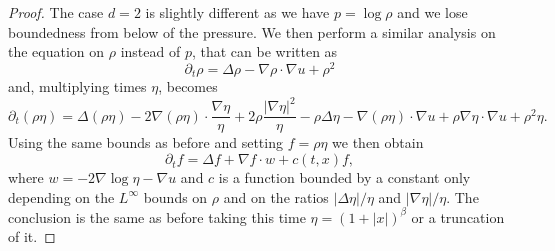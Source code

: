 \documentclass[11pt,a4paper]{article}
\numberwithin{equation}{section}
\theoremstyle{plain}
\theoremstyle{remark}
\begin{document}
\begin{proof}
The case $d=2$ is slightly different as we have $p=\log\rho$ and we lose boundedness from below of the pressure. We then perform a similar analysis on the equation on $\rho$ instead of $p$, that can be written as
$$
    \partial_t\rho=\Delta\rho-\nabla\rho\cdot\nabla u +\rho^2
$$
and, multiplying times $\eta$, becomes
$$
    \partial_t(\rho\eta)=\Delta(\rho\eta)-2\nabla(\rho\eta)\cdot\frac{\nabla\eta}{\eta}+2\rho\frac{|\nabla\eta|^2}{\eta}-\rho\Delta\eta-\nabla(\rho\eta)\cdot\nabla u +\rho\nabla\eta\cdot\nabla u+\rho^2\eta.
$$
Using the same bounds as before and setting $f=\rho\eta$ we then obtain
$$\partial_t f= \Delta f+\nabla f\cdot w+c(t,x)f,$$
where $w=-2\nabla \log\eta-\nabla u$ and $c$ is a function bounded by a constant only depending on the $L^\infty$ bounds on $\rho$ and on the ratios $|\Delta\eta|/\eta$ and $|\nabla\eta|/\eta$. The conclusion is the same as before taking this time $\eta=(1+|x|)^\beta$ or a truncation of it.
\end{proof}
\end{document}
